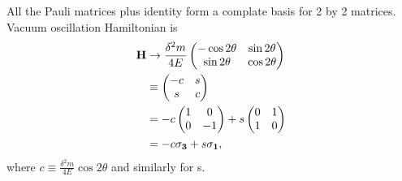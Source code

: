 \documentclass[letterpaper,12pt,english]{sphinxmanual}
\begin{document}
All the Pauli matrices plus identity form a complate basis for 2 by 2 matrices. Vacuum oscillation Hamiltonian is
\begin{gather}
\begin{split}\mathbf H &\to \frac{\delta^2m}{4E} \begin{pmatrix} -\cos 2\theta & \sin 2 \theta \\ \sin 2\theta & \cos 2\theta \end{pmatrix} \\
& \equiv \begin{pmatrix} -c & s \\ s & c \end{pmatrix}\\
& = -c \begin{pmatrix} 1 & 0 \\ 0 & -1 \end{pmatrix} + s\begin{pmatrix} 0 & 1 \\ 1 & 0 \end{pmatrix} \\
& = -c \mathbf{\sigma_3} + s \mathbf{ \sigma_1},\end{split}\notag
\end{gather}
where \(c\equiv \frac{\delta^2 m}{4E}\cos 2 \theta\) and similarly for s.
\end{document}
